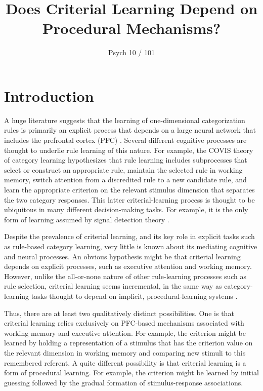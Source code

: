 \documentclass[jou,apacite]{apa6}
\title{Does Criterial Learning Depend on Procedural Mechanisms?}
\author{Psych 10 / 101}
\affiliation{UC Berkeley Psych 10 / 101 Summer Course 2018}
\begin{document}
\maketitle 

\section{Introduction}
A huge literature suggests that the learning of one-dimensional categorization
rules is primarily an explicit process that depends on a large neural network
that includes the prefrontal cortex (PFC) \cite{AshbyCOVIS1998, BungeWallis2007,
erickson1998rules}. Several different cognitive processes are thought to
underlie rule learning of this nature. For example, the COVIS theory of category
learning \cite{AshbyCOVIS1998} hypothesizes that rule learning includes
subprocesses that select or construct an appropriate rule, maintain the selected
rule in working memory, switch attention from a discredited rule to a new
candidate rule, and learn the appropriate criterion on the relevant stimulus
dimension that separates the two category responses. This latter
criterial-learning process is thought to be ubiquitous in many different
decision-making tasks. For example, it is the only form of learning assumed by
signal detection theory \cite{MacmillanCreelman2005}.

Despite the prevalence of criterial learning, and its key role in explicit tasks
such as rule-based category learning, very little is known about its mediating
cognitive and neural processes. An obvious hypothesis might be that criterial
learning depends on explicit processes, such as executive attention and working
memory. However, unlike the all-or-none nature of other rule-learning processes
such as rule selection, criterial learning seems incremental, in the same way as
category-learning tasks thought to depend on implicit, procedural-learning
systems \cite{SmithEll2015}.

Thus, there are at least two qualitatively distinct possibilities. One is that
criterial learning relies exclusively on PFC-based mechanisms associated with
working memory and executive attention. For example, the criterion might be
learned by holding a representation of a stimulus that has the criterion value
on the relevant dimension in working memory and comparing new stimuli to this
remembered referent. A quite different possibility is that criterial learning is
a form of procedural learning. For example, the criterion might be learned by
initial guessing followed by the gradual formation of stimulus-response
associations.
\end{document}
